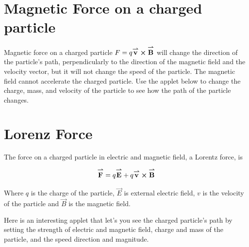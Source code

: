 \documentclass{ximera}
\begin{document}
\section{Magnetic Force on a charged particle}

Magnetic force on a charged particle $F=q {\overset{\boldsymbol{\rightharpoonup}}{\mathbf{v}}}\hspace{0in} \boldsymbol\times {\overset{\boldsymbol{\rightharpoonup}}{\mathbf{B}}}\hspace{0in}$ will change the direction of the particle's path, perpendicularly to the direction of the magnetic field and the velocity vector, but it will not change the speed of the particle. The magnetic field cannot accelerate the charged particle. Use the applet below to change the charge, mass, and velocity of the particle to see how the path of the particle changes.





\section{Lorenz Force}

The force on a charged particle in electric and magnetic field, a Lorentz force, is  

\begin{equation}
{\overset{\boldsymbol{\rightharpoonup}}{\mathbf{F}}}\hspace{0in}=q{\overset{\boldsymbol{\rightharpoonup}}{\mathbf{E}}}\hspace{0in} + q {\overset{\boldsymbol{\rightharpoonup}}{\mathbf{v}}}\hspace{0in} \boldsymbol\times {\overset{\boldsymbol{\rightharpoonup}}{\mathbf{B}}}\hspace{0in}
\end{equation}

Where $q$ is the charge of the particle, $\vec{E}$ is external electric field, $v$ is the velocity of the particle and $\vec{B}$ is the magnetic field.


Here is an interesting applet that let's you see the charged particle's path by setting the strength of electric and magnetic field, charge and mass of the particle, and the speed direction and magnitude.

\end{document}

